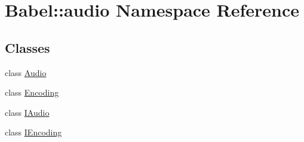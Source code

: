\hypertarget{namespaceBabel_1_1audio}{}\section{Babel\+:\+:audio Namespace Reference}
\label{namespaceBabel_1_1audio}
\subsection*{Classes}
\begin{DoxyCompactItemize}
\item 
class \hyperlink{classBabel_1_1audio_1_1Audio}{Audio}
\item 
class \hyperlink{classBabel_1_1audio_1_1Encoding}{Encoding}
\item 
class \hyperlink{classBabel_1_1audio_1_1IAudio}{I\+Audio}
\item 
class \hyperlink{classBabel_1_1audio_1_1IEncoding}{I\+Encoding}
\end{DoxyCompactItemize}
